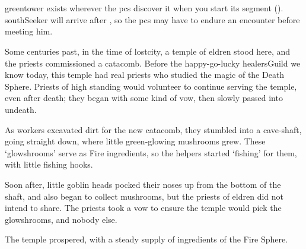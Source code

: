 \section{}
\label{green_tower}

\begin{multicols}{2}

\noindent
\Gls{greentower} exists wherever the \glspl{pc} discover it when you start its \gls{segment} ().
\Gls{southSeeker} will arrive after , so the \glspl{pc} may have to endure an encounter before meeting him.



\begin{exampletext}
  Some centuries past, in the time of \gls{lostcity}, a temple of \gls{eldren} stood here, and the priests commissioned a catacomb.
  Before the happy-go-lucky \gls{healersGuild} we know today, this temple had real priests who studied the magic of the Death Sphere.
  Priests of high standing would volunteer to continue serving the temple, even after death; they began with some kind of vow, then slowly passed into undeath.

  As workers excavated dirt for the new catacomb, they stumbled into a cave-shaft, going straight down, where little green-glowing mushrooms grew.%
  These `glowshrooms' serve as Fire \glspl{ingredient}, so the \glspl{helper} started `fishing' for them, with little fishing hooks.

  Soon after, little goblin heads pocked their noses up from the bottom of the shaft, and also began to collect mushrooms, but the priests of \gls{eldren} did not intend to share.
  The priests took a vow to ensure the temple would pick the glowshrooms, and nobody else.

  The temple prospered, with a steady supply of \glspl{ingredient} of the Fire Sphere.
\end{exampletext}


\end{multicols}
